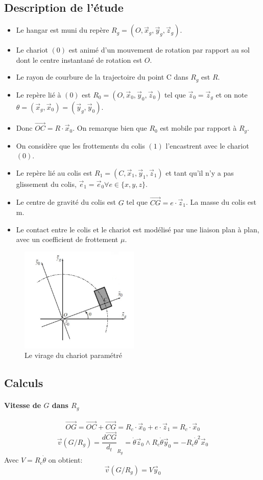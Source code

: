 \subsection{Description de l'étude}
\begin{itemize}
	\item Le hangar est muni du repère $R_g = (O,\vec x_g, \vec y_g, \vec z_g)$.
	\item Le chariot $(0)$ est animé d'un mouvement de rotation par rapport au sol dont le centre instantané de rotation est $O$.
	\item Le rayon de courbure de la trajectoire du point C dans $R_g$ est $R$.
	\item Le repère lié à $(0)$ est $R_0 = (O, \vec x_0, \vec y_0, \vec z_0)$ tel que $\vec z_0 = \vec z_g$ et on note $\theta = (\vec x_g, \vec x_0) = (\vec y_g, \vec y_0)$.
	\item Donc $\vec{OC} = R \cdot \vec x_0$. On remarque bien que $R_0$ est mobile par rapport à $R_g$.
	\item On considère que les frottements du colis $(1)$ l'encastrent avec le chariot $(0)$.
	\item Le repère lié au colis est $R_1 = (C, \vec x_1, \vec y_1, \vec z_1)$ et tant qu'il n'y a pas glissement du colis, $\vec e_1 = \vec e_0 \forall e \in \{x,y,z\}$.
	\item Le centre de gravité du colis est $G$ tel que $\vec{CG} = e\cdot\vec z_1$. La masse du colis est m.
	\item Le contact entre le colis et le chariot est modélisé par une liaison plan à plan, avec un coefficient de frottement $\mu$.
\end{itemize}
\begin{figure}
	\centering
	\includegraphics[height=5cm]{schema_chariot3}
	\caption{Le virage du chariot paramétré}
	\label{fig:schemaChariot3}
\end{figure}
\subsection{Calculs}
\paragraph{Vitesse de $G$ dans $R_g$}
\[\vec{OG} = \vec{OC} + \vec{CG} = R_c \cdot \vec x_0 + e\cdot \vec z_1 = R_c \cdot \vec x_0\]
\[\vec v(G/R_g) = \frac{d\vec{CG}}{d_t}_{R_g} = \dot \theta \vec z_0 \wedge R_c \dot \theta \vec y_0 = -R_c \dot \theta^2 \vec x_0 \]
Avec $ V = R_c \dot \theta$ on obtient:
\begin{equation}
	\vec v(G / R_g) =V \vec y_0
\end{equation}
